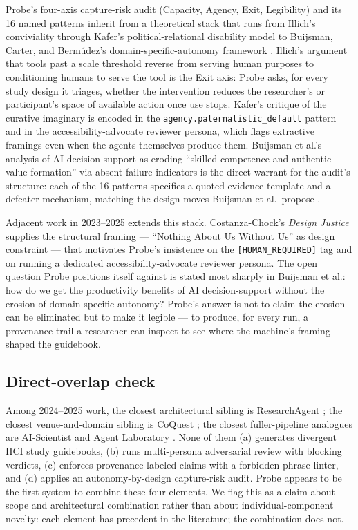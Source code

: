Probe's four-axis capture-risk audit (Capacity, Agency, Exit, Legibility) and its 16 named patterns inherit from a theoretical stack that runs from Illich's conviviality \citep{illich1973conviviality} through Kafer's political-relational disability model \citep{kafer2013feminist} to Buijsman, Carter, and Bermúdez's domain-specific-autonomy framework \citep{buijsman2025autonomy}. Illich's argument that tools past a scale threshold reverse from serving human purposes to conditioning humans to serve the tool is the Exit axis: Probe asks, for every study design it triages, whether the intervention reduces the researcher's or participant's space of available action once use stops. Kafer's critique of the curative imaginary is encoded in the \texttt{agency.paternalistic\_default} pattern and in the accessibility-advocate reviewer persona, which flags extractive framings even when the agents themselves produce them. Buijsman et al.'s analysis of AI decision-support as eroding ``skilled competence and authentic value-formation'' via absent failure indicators is the direct warrant for the audit's structure: each of the 16 patterns specifies a quoted-evidence template and a defeater mechanism, matching the design moves Buijsman et al.\ propose \citep{buijsman2025autonomy}.

Adjacent work in 2023--2025 extends this stack. Costanza-Chock's \emph{Design Justice} \citep{costanzachock2020designjustice} supplies the structural framing --- ``Nothing About Us Without Us'' as design constraint --- that motivates Probe's insistence on the \texttt{[HUMAN\_REQUIRED]} tag and on running a dedicated accessibility-advocate reviewer persona. The open question Probe positions itself against is stated most sharply in Buijsman et al.: how do we get the productivity benefits of AI decision-support without the erosion of domain-specific autonomy? Probe's answer is not to claim the erosion can be eliminated but to make it legible --- to produce, for every run, a provenance trail a researcher can inspect to see where the machine's framing shaped the guidebook.

\subsection{Direct-overlap check}

Among 2024--2025 work, the closest architectural sibling is ResearchAgent \citep{baek2025researchagent}; the closest venue-and-domain sibling is CoQuest \citep{liu2024coquest}; the closest fuller-pipeline analogues are AI-Scientist and Agent Laboratory \citep{lu2024aiscientist, schmidgall2025agentlab}. None of them (a) generates divergent HCI study guidebooks, (b) runs multi-persona adversarial review with blocking verdicts, (c) enforces provenance-labeled claims with a forbidden-phrase linter, and (d) applies an autonomy-by-design capture-risk audit. Probe appears to be the first system to combine these four elements. We flag this as a claim about scope and architectural combination rather than about individual-component novelty: each element has precedent in the literature; the combination does not.
